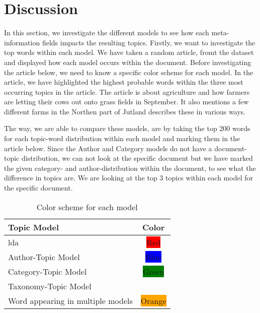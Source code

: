 \section{Discussion}\label{sec:discussion}
In this section, we investigate the different models to see how each meta-information fields impacts the resulting topics.
Firstly, we want to investigate the top words within each model.
We have taken a random article, fromt the dataset and displayed how each model occurs within the document. 
Before investigating the article below, we need to know a specific color scheme for each model.
In the article, we have highlighted the highest probable words within the three most occurring topics in the article.
The article is about agriculture and how farmers are letting their cows out onto grass fields in September. 
It also mentions a few different farms in the Northen part of Jutland describes these in various ways.

The way, we are able to compare these models, are by taking the top 200 words for each topic-word distribution within each model and marking them in the article below.
Since the Author and Category models do not have a document-topic distribution, we can not look at the specific document but we have marked the given category- and author-distribution within the document, to see what the difference in topics are.
We are looking at the top 3 topics within each model for the specific document.

\begin{table}[h]
	\centering
	\caption{Color scheme for each model}
	\begin{tabular}{l|c}
		Topic Model & Color \\
		\midrule
		\Acrlong{lda} & \colorbox{red}{Red} \\
		Author-Topic Model & \colorbox{blue}{Blue} \\
		Category-Topic Model & \colorbox{green}{Green} \\
		Taxonomy-Topic Model & \\
		Word appearing in multiple models & \colorbox{orange}{Orange}  \\
	\end{tabular}
	\label{tab:disc_color}
\end{table}


